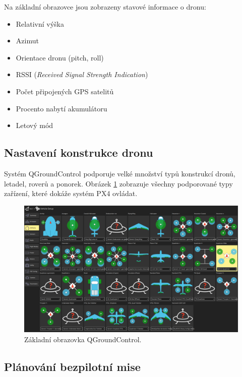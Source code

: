 Na základní obrazovce jsou zobrazeny stavové informace o dronu:

\begin{itemize}
    \item Relativní výška
    \item Azimut
    \item Orientace dronu (pitch, roll)
    \item RSSI (\textit{Received Signal Strength Indication})
    \item Počet připojených GPS satelitů
    \item Procento nabytí akumulátoru
    \item Letový mód
\end{itemize}

\subsection{Nastavení konstrukce dronu}

Systém QGroundControl podporuje velké množství typů konstrukcí dronů, letadel, roverů a ponorek. Obrázek \ref{fig:QGC1} zobrazuje všechny podporované typy zařízení, které dokáže systém PX4 ovládat.

\begin{figure}[!ht]
    \begin{center}
        \includegraphics[scale=0.31]{obrazky/QG2}
    \end{center}
    \caption[Základní obrazovka QGroundControl]{Základní obrazovka QGroundControl.}
    \label{fig:QGC1}
\end{figure}

\subsection{Plánování bezpilotní mise}

